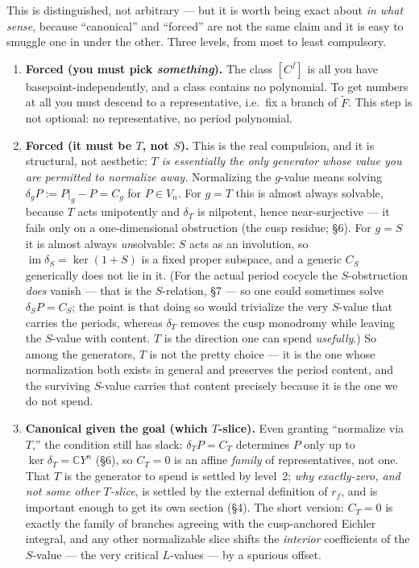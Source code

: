 \documentclass[11pt]{article}
\newcommand{\CC}{\mathbb{C}}
\newcommand{\Vn}{V_n}
\newcommand{\Eich}{\widetilde{F}}
\DeclareMathOperator{\im}{im}
\begin{document}
This is distinguished, not arbitrary --- but it is worth being exact
about \emph{in what sense}, because ``canonical'' and ``forced'' are not
the same claim and it is easy to smuggle one in under the other. Three
levels, from most to least compulsory.

\begin{enumerate}[leftmargin=1.5em, itemsep=4pt]
\item \textbf{Forced (you must pick \emph{something}).} The class $[C^f]$
is all you have basepoint-independently, and a class contains no
polynomial. To get numbers at all you must descend to a representative,
i.e.\ fix a branch of $\Eich$. This step is not optional: no
representative, no period polynomial.

\item \textbf{Forced (it must be $T$, not $S$).} This is the real
compulsion, and it is structural, not aesthetic: \emph{$T$ is essentially
the only generator whose value you are permitted to normalize away.}
Normalizing the $g$-value means solving $\delta_g P := P|_g - P = C_g$ for
$P \in \Vn$. For $g = T$ this is almost always solvable, because $T$ acts
unipotently and $\delta_T$ is nilpotent, hence near-surjective --- it
fails only on a one-dimensional obstruction (the cusp residue; \S6). For
$g = S$ it is almost always \emph{un}solvable: $S$ acts as an involution,
so $\im \delta_S = \ker(1+S)$ is a fixed proper subspace, and a generic
$C_S$ generically does not lie in it. (For the actual period cocycle the
$S$-obstruction \emph{does} vanish --- that is the $S$-relation,
\S7 --- so one could sometimes solve $\delta_S P = C_S$; the point is that
doing so would trivialize the very $S$-value that carries the periods,
whereas $\delta_T$ removes the cusp monodromy while leaving the $S$-value
with content. $T$ is the direction one can spend \emph{usefully}.) So
among the generators, $T$ is not the pretty choice --- it is the one
whose normalization both exists in general and preserves the period
content, and the surviving $S$-value carries that content precisely
because it is the one we do not spend.

\item \textbf{Canonical given the goal (which $T$-slice).} Even granting
``normalize via $T$,'' the condition still has slack: $\delta_T P = C_T$
determines $P$ only up to $\ker\delta_T = \CC Y^n$ (\S6), so $C_T = 0$ is
an affine \emph{family} of representatives, not one. That $T$ is the
generator to spend is settled by level~2; \emph{why exactly-zero, and not
some other $T$-slice}, is settled by the external definition of $r_f$,
and is important enough to get its own section (\S4). The short version:
$C_T = 0$ is exactly the family of branches agreeing with the
cusp-anchored Eichler integral, and any other normalizable slice shifts
the \emph{interior} coefficients of the $S$-value --- the very critical
$L$-values --- by a spurious offset.
\end{enumerate}
\end{document}
